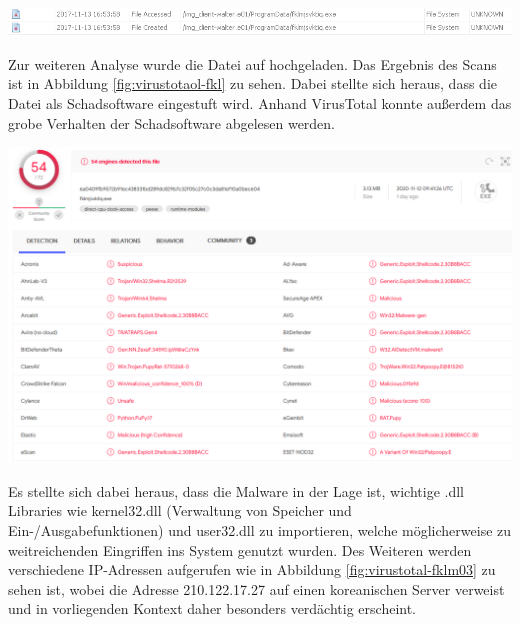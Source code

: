 \begin{center}
	\includegraphics[width=15.8cm]{figures/malware-fklm.png}
	\label{fig:malware-fklm}
\end{center}

Zur weiteren Analyse wurde die Datei auf  hochgeladen.
Das Ergebnis des Scans ist in Abbildung \ref{fig:virustotaol-fkl} zu sehen.
Dabei stellte sich heraus, dass die Datei als Schadsoftware eingestuft wird. Anhand VirusTotal konnte außerdem das grobe Verhalten der Schadsoftware abgelesen werden.
\begin{center}
	\includegraphics[width=15.8cm]{figures/virustotaol-fklm.PNG}
	\label{fig:virustotaol-fkl}
\end{center}

\newpage
Es stellte sich dabei heraus, dass die Malware in der Lage ist, wichtige .dll Libraries wie kernel32.dll (Verwaltung von Speicher und  Ein-/Ausgabefunktionen) und user32.dll zu importieren, welche möglicherweise zu weitreichenden Eingriffen ins System genutzt wurden.
Des Weiteren werden verschiedene IP-Adressen aufgerufen wie in Abbildung \ref{fig:virustotal-fklm03} zu sehen ist, wobei die Adresse 210.122.17.27 auf einen koreanischen Server verweist und in vorliegenden Kontext daher besonders verdächtig erscheint.

